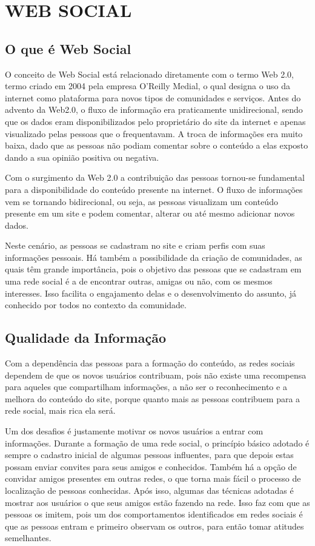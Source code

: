 \chapter{WEB SOCIAL} %
\label{cha:web_social}

\section{O que é Web Social}

O conceito de Web Social está relacionado diretamente com o termo Web 2.0, termo criado em 2004 pela empresa O'Reilly Medial, o qual designa o uso da internet como plataforma para novos tipos de comunidades e serviços. Antes do advento da Web2.0, o fluxo de informação era praticamente unidirecional, sendo que os dados eram disponibilizados pelo proprietário do site da internet e apenas visualizado pelas pessoas que o frequentavam. A troca de informações era muito baixa, dado que as pessoas não podiam comentar sobre o conteúdo a elas exposto dando a sua opinião positiva ou negativa.

Com o surgimento da Web 2.0 a contribuição das pessoas tornou-se fundamental para a disponibilidade do conteúdo presente na internet. O fluxo de informações vem se tornando bidirecional, ou seja, as pessoas visualizam um conteúdo presente em um site e podem comentar, alterar ou até mesmo adicionar novos dados.

Neste cenário, as pessoas se cadastram no site e criam perfis com suas informações pessoais. Há também a possibilidade da criação de comunidades, as quais têm grande importância, pois o objetivo das pessoas que se cadastram em uma rede social é a de encontrar outras, amigas ou não, com os mesmos interesses. Isso facilita o engajamento delas e o desenvolvimento do assunto, já conhecido por todos no contexto da comunidade.

\section{Qualidade da Informação}

Com a dependência das pessoas para a formação do conteúdo, as redes sociais dependem de que os novos usuários contribuam, pois não existe uma recompensa para aqueles que compartilham informações, a não ser o reconhecimento e a melhora do conteúdo do site, porque quanto mais as pessoas contribuem para a rede social, mais rica ela será.

Um dos desafios é justamente motivar os novos usuários a entrar com informações. Durante a formação de uma rede social, o princípio básico adotado é sempre o cadastro inicial de algumas pessoas influentes, para que depois estas possam enviar convites para seus amigos e conhecidos. Também há a opção de convidar amigos presentes em outras redes, o que torna mais fácil o processo de localização de pessoas conhecidas. Após isso, algumas das técnicas adotadas é mostrar aos usuários o que seus amigos estão fazendo na rede. Isso faz com que as pessoas os imitem, pois um dos comportamentos identificados em redes sociais é que as pessoas entram e primeiro observam os outros, para então tomar atitudes semelhantes.

